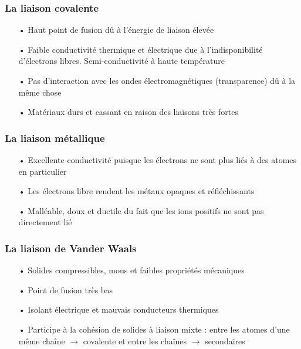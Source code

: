 		\subsubsection{La liaison covalente}
			\begin{itemize}
				\item[•] Haut point de fusion dû à l'énergie de liaison élevée
				\item[•] Faible conductivité thermique et électrique due à l'indisponibilité d'électrons libres. Semi-conductivité à haute température
				\item[•] Pas d'interaction avec les ondes électromagnétiques (transparence) dû à la même chose
				\item[•] Matériaux durs et cassant en raison des liaisons très fortes
			\end{itemize}		
		\subsubsection{La liaison métallique}
			\begin{itemize}
				\item[•] Excellente conductivité puisque les électrons ne sont plus liés à des atomes en particulier
				\item[•] Les électrons libre rendent les métaux opaques et réfléchissants
				\item[•] Malléable, doux et ductile du fait que les ions positifs ne sont pas directement lié
			\end{itemize}
			
		\subsubsection{La liaison de Vander Waals}
			\begin{itemize}			
			\item[•] Solides compressibles, mous et faibles propriétés mécaniques
			\item[•] Point de fusion très bas
			\item[•] Isolant électrique et mauvais conducteurs thermiques 
			\item[•] Participe à la cohésion de solides à liaison mixte : entre les atomes d'une même chaîne $\rightarrow$ covalente et entre les chaînes $\rightarrow$ secondaires
			\end{itemize}
